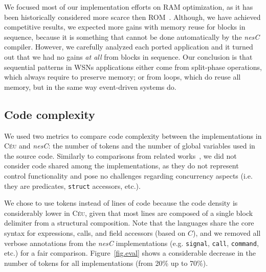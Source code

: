 \documentclass[10pt]{sensys-proc}
\newcommand{\CEU}{\textsc{C\'{e}u}\xspace}
\newcommand{\code}[1] {{\small{\texttt{#1}}}}
\begin{document}
We focused most of our implementation efforts on RAM optimization, as it has 
been historically considered more scarce then ROM~\cite{wsn.decade}.
Although, we have achieved competitive results, we expected more gains with 
memory reuse for blocks in sequence, because it is something that cannot be 
done automatically by the \emph{nesC} compiler.
However, we carefully analyzed each ported application and it turned out that 
we had no gains \emph{at all} from blocks in sequence.
Our conclusion is that sequential patterns in WSNs applications either come 
from split-phase operations, which always require to preserve memory;
or from loops, which do reuse all memory, but in the same way event-driven 
systems do.

\subsection{Code complexity}
\label{sec.eval.code}

We used two metrics to compare code complexity between the implementations in 
\CEU and \emph{nesC}: the number of tokens and the number of global variables 
used in the source code.
%
Similarly to comparisons from related works~\cite{wsn.ocram,wsn.protothreads}, 
we did not consider code shared among the implementations, as they do not 
represent control functionality and pose no challenges regarding concurrency 
aspects (i.e. they are predicates, \code{struct} accessors, etc.).

We chose to use tokens instead of lines of code because the code density is 
considerably lower in \CEU, given that most lines are composed of a single 
block delimiter from a structural composition.
%
Note that the languages share the core syntax for expressions, calls, and field 
accessors (based on $C$), and we removed all verbose annotations from the 
\emph{nesC} implementations (e.g. \code{signal}, \code{call}, \code{command}, 
etc.) for a fair comparison.
%
Figure~\ref{fig.eval} shows a considerable decrease in the number of tokens for 
all implementations (from 20\% up to 70\%).
\end{document}
